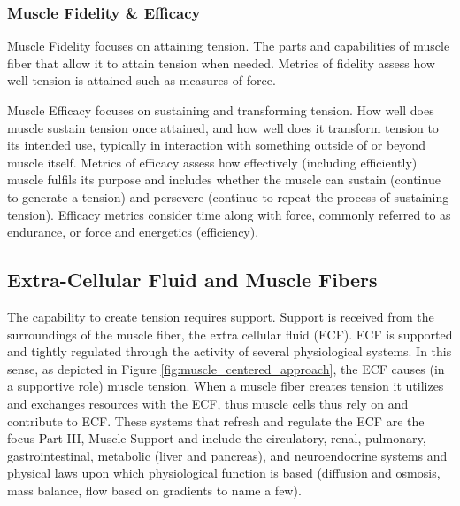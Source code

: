 \subsubsection{Muscle Fidelity \& Efficacy}

Muscle Fidelity focuses on attaining tension. The parts and capabilities of muscle fiber that allow it to attain tension when needed. Metrics of fidelity assess how well tension is attained such as measures of force.

Muscle Efficacy focuses on sustaining and transforming tension. How well does muscle sustain tension once attained, and how well does it transform tension to its intended use, typically in interaction with something outside of or beyond muscle itself. Metrics of efficacy assess how effectively (including efficiently) muscle fulfils its purpose and includes whether the muscle can sustain (continue to generate a tension) and persevere (continue to repeat the process of sustaining tension). Efficacy metrics consider time along with force, commonly referred to as endurance, or force and energetics (efficiency). 

\subsection{Extra-Cellular Fluid and Muscle Fibers}

The capability to create tension requires support. Support is received from the surroundings of the muscle fiber, the extra cellular fluid (ECF). ECF is supported and tightly regulated through the activity of several physiological systems. In this sense, as depicted in Figure \ref{fig:muscle_centered_approach}, the ECF causes (in a supportive role) muscle tension.\footnotemark{} When a muscle fiber creates tension it utilizes and exchanges resources with the ECF, thus muscle cells thus rely on and contribute to ECF. These systems that refresh and regulate the ECF are the focus Part III, Muscle Support and include the circulatory, renal, pulmonary, gastrointestinal, metabolic (liver and pancreas), and neuroendocrine systems and physical laws upon which physiological function is based (diffusion and osmosis, mass balance, flow based on gradients to name a few).

